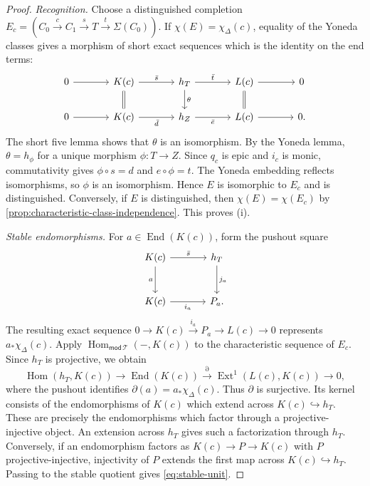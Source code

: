 \documentclass[a4paper,11pt,reqno]{amsart}
\theoremstyle{definition}
\theoremstyle{plain}
\numberwithin{equation}{section}
\newcommand{\T}{\mathcal T}
\newcommand{\Hom}{\operatorname{Hom}}
\newcommand{\End}{\operatorname{End}}
\newcommand{\Ext}{\operatorname{Ext}}
\begin{document}
\begin{proof}
\emph{Recognition.}
Choose a distinguished completion
$E_c=(C_0\xrightarrow{c}C_1\xrightarrow{s}T
\xrightarrow{t}\Sigma(C_0))$.
If $\chi(E)=\chi_\Delta(c)$, equality of the Yoneda classes gives a
morphism of short exact sequences which is the identity on the end terms:
\[
\begin{tikzcd}[column sep=large]
0 \arrow[r] & K(c) \arrow[r,"\bar s"] \arrow[d,equal]
  & h_T \arrow[r,"\bar t"] \arrow[d,"\theta"]
  & L(c) \arrow[r] \arrow[d,equal] &0\\
0 \arrow[r] & K(c) \arrow[r,"\bar d"']
  & h_Z \arrow[r,"\bar e"']
  & L(c) \arrow[r] &0.
\end{tikzcd}
\]
The short five lemma shows that $\theta$ is an isomorphism.
By the Yoneda lemma, $\theta=h_\phi$ for a unique morphism
$\phi:T\to Z$.  Since $q_c$ is epic and $i_c$ is monic, commutativity gives
$\phi\circ s=d$ and $e\circ\phi=t$.  The Yoneda embedding reflects
isomorphisms, so $\phi$ is an isomorphism.  Hence $E$ is isomorphic to
$E_c$ and is distinguished.  Conversely, if $E$ is distinguished, then
$\chi(E)=\chi(E_c)$ by
\cref{prop:characteristic-class-independence}.  This proves (i).

\emph{Stable endomorphisms.}
For $a\in\End(K(c))$, form the pushout square
\[
\begin{tikzcd}[column sep=large,row sep=large]
 K(c) \arrow[r,"\bar s"] \arrow[d,"a"']
   & h_T \arrow[d,"j_a"] \\
 K(c) \arrow[r,"i_a"'] & P_a.
\end{tikzcd}
\]
The resulting exact sequence
$0\to K(c)\xrightarrow{i_a}P_a\to L(c)\to0$ represents
$a_*\chi_\Delta(c)$.  Apply
$\Hom_{\mathsf{mod}\,\T}(-,K(c))$ to the characteristic sequence of
$E_c$.  Since $h_T$ is projective, we obtain
\[
 \Hom(h_T,K(c))\longrightarrow\End(K(c))
 \xrightarrow{\partial}
 \Ext^1(L(c),K(c))\longrightarrow0,
\]
where the pushout identifies $\partial(a)=a_*\chi_\Delta(c)$.  Thus
$\partial$ is surjective.  Its kernel consists of the endomorphisms of
$K(c)$ which extend across $K(c)\hookrightarrow h_T$.  These are precisely
the endomorphisms which factor through a projective-injective object.  An
extension across $h_T$ gives such a factorization through $h_T$.
Conversely, if an endomorphism factors as $K(c)\to P\to K(c)$ with $P$
projective-injective, injectivity of $P$ extends the first map across
$K(c)\hookrightarrow h_T$.  Passing to the stable quotient gives
\eqref{eq:stable-unit}.
\end{proof}
\end{document}
